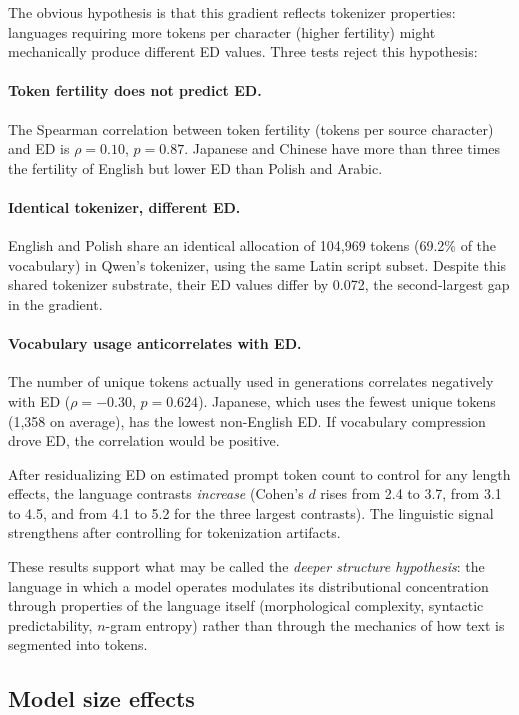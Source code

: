 \documentclass{article}
\begin{document}
The obvious hypothesis is that this gradient reflects tokenizer properties: languages requiring more tokens per character (higher fertility) might mechanically produce different ED values. Three tests reject this hypothesis:

\paragraph{Token fertility does not predict ED.} The Spearman correlation between token fertility (tokens per source character) and ED is $\rho = 0.10$, $p = 0.87$. Japanese and Chinese have more than three times the fertility of English but lower ED than Polish and Arabic.

\paragraph{Identical tokenizer, different ED.} English and Polish share an identical allocation of 104,969 tokens (69.2\% of the vocabulary) in Qwen's tokenizer, using the same Latin script subset. Despite this shared tokenizer substrate, their ED values differ by 0.072, the second-largest gap in the gradient.

\paragraph{Vocabulary usage anticorrelates with ED.} The number of unique tokens actually used in generations correlates negatively with ED ($\rho = -0.30$, $p = 0.624$). Japanese, which uses the fewest unique tokens (1,358 on average), has the lowest non-English ED. If vocabulary compression drove ED, the correlation would be positive.

After residualizing ED on estimated prompt token count to control for any length effects, the language contrasts \emph{increase} (Cohen's $d$ rises from 2.4 to 3.7, from 3.1 to 4.5, and from 4.1 to 5.2 for the three largest contrasts). The linguistic signal strengthens after controlling for tokenization artifacts.

These results support what may be called the \emph{deeper structure hypothesis}: the language in which a model operates modulates its distributional concentration through properties of the language itself (morphological complexity, syntactic predictability, $n$-gram entropy) rather than through the mechanics of how text is segmented into tokens.

\subsection{Model size effects}
\end{document}
